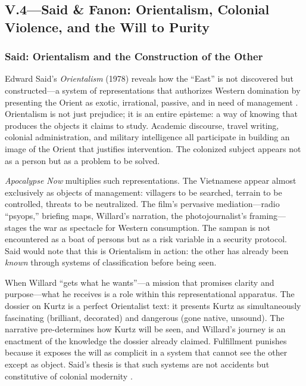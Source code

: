 \subsection*{V.4—Said \& Fanon: Orientalism, Colonial Violence, and the Will to Purity}
\label{ssec:v-said-fanon}

\subsubsection*{Said: Orientalism and the Construction of the Other}
Edward Said's \textit{Orientalism} (1978) reveals how the ``East'' is not discovered but 
constructed---a system of representations that authorizes Western domination by presenting the 
Orient as exotic, irrational, passive, and in need of management \parencite{SaidOrientalism1978}. 
Orientalism is not just prejudice; it is an entire episteme: a way of knowing that produces the 
objects it claims to study. Academic discourse, travel writing, colonial administration, and 
military intelligence all participate in building an image of the Orient that justifies 
intervention. The colonized subject appears not as a person but as a problem to be solved.

\textit{Apocalypse Now} multiplies such representations. The Vietnamese appear almost 
exclusively as objects of management: villagers to be searched, terrain to be controlled, 
threats to be neutralized. The film's pervasive mediation---radio ``psyops,'' briefing maps, 
Willard's narration, the photojournalist's framing---stages the war as spectacle for Western 
consumption. The sampan is not encountered as a boat of persons but as a risk variable in a 
security protocol. Said would note that this is Orientalism in action: the other has already 
been \emph{known} through systems of classification before being seen.

When Willard ``gets what he wants''---a mission that promises clarity and purpose---what he 
receives is a role within this representational apparatus. The dossier on Kurtz is a perfect 
Orientalist text: it presents Kurtz as simultaneously fascinating (brilliant, decorated) and 
dangerous (gone native, unsound). The narrative pre-determines how Kurtz will be seen, and 
Willard's journey is an enactment of the knowledge the dossier already claimed. Fulfillment 
punishes because it exposes the will as complicit in a system that cannot see the other except 
as object. Said's thesis is that such systems are not accidents but constitutive of colonial 
modernity \parencite{SaidOrientalism1978}.

